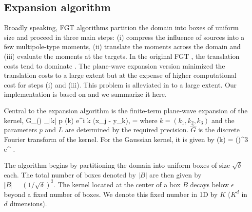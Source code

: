 \subsection{Expansion algorithm}
Broadly speaking, FGT algorithms \cite{fgt, greengard98} partition the domain into boxes of uniform size and proceed in three main steps: (i) compress the influence of sources into a few multipole-type moments, (ii) translate the moments across the domain and (iii) evaluate the moments at the targets. In the original FGT \cite{fgt}, the translation costs tend to dominate \cite{fggt}. The plane-wave expansion version \cite{greengard98} minimized the translation costs to a large extent but at the expense of higher computational cost for steps (i) and (iii). This problem is alleviated in \cite{fggt} to a large extent. Our implementation is based on \cite{fggt} and we summarize it here. 

Central to the expansion algorithm is the finite-term plane-wave expansion of the kernel,
\beq G_\delta() \approx \sum_{|k| \leq p} (k) e^{i \lambda k \cdot (x_j - y_k)}, \quad \lambda = \eeq
where $k = (k_1, k_2, k_3)$ and the parameters $p$ and $L$ are determined by the required precision. $\hat{G}$ is the discrete Fourier transform of the kernel. For the Gaussian kernel, it is given by
\beq {}(k) = \left(\right)^3 e^{-}. \label{eqn:ghat}\eeq

The algorithm begins by partitioning the domain into uniform boxes of size $\sqrt{\delta}$ each. The total number of boxes denoted by $|B|$ are then given by $|B| = (1/\sqrt{\delta})^3$. The kernel located at the center of a box $B$ decays below $\epsilon$ beyond a fixed number of boxes. We denote this fixed number in 1D by $K$ ($K^d$ in $d$ dimensions). 

